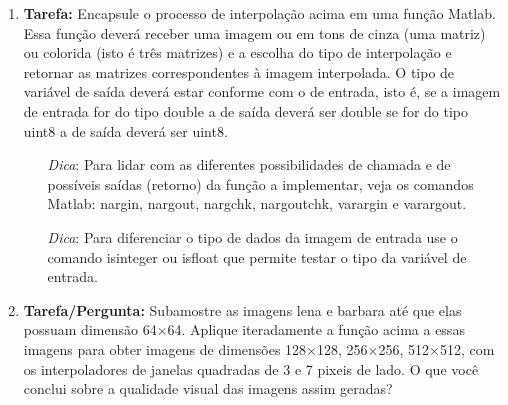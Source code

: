 \documentclass[11pt]{article}
\begin{document}
\begin{enumerate}

\item \textbf{Tarefa:} Encapsule o processo de interpolação acima em uma função \textrm{Matlab}. Essa função deverá receber uma imagem ou em tons de cinza (uma matriz) ou colorida (isto é três matrizes) e a escolha do tipo de interpolação e retornar as matrizes correspondentes à imagem interpolada. O tipo de variável de saída deverá estar conforme com o de entrada, isto é, se a imagem de entrada for do tipo \textsf{double} a de saída deverá ser \textsf{double} se for do tipo \textsf{uint8} a de saída deverá ser \textsf{uint8}.

\begin{itemize}
\item[\textit{Dica}:] Para lidar com as diferentes possibilidades de chamada e de possíveis saídas (retorno) da função a implementar, veja os comandos \textsf{Matlab}: \textsf{nargin}, \textsf{nargout}, \textsf{nargchk}, \textsf{nargoutchk}, \textsf{varargin} e \textsf{varargout}.

\item[\textit{Dica}:] Para diferenciar o tipo de dados da imagem de entrada use o comando \textsf{isinteger} ou \textsf{isfloat} que permite testar o tipo da variável de entrada.

\end{itemize}

\item \textbf{Tarefa/Pergunta:} Subamostre as imagens \textsf{lena} e \textsf{barbara} até que elas possuam dimensão 64$\times$64. Aplique iteradamente a função acima a essas imagens para obter imagens de dimensões 128$\times$128, 256$\times$256, 512$\times$512, com os interpoladores de janelas quadradas de 3 e 7 pixeis de lado. O que você conclui sobre a qualidade visual das imagens assim geradas?

\end{enumerate}
\end{document}
